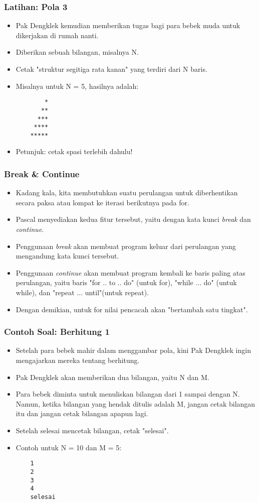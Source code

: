 \documentclass{beamer}
\begin{document}
\begin{frame}[fragile]
\frametitle{Latihan: Pola 3}
\begin{itemize}
	\item Pak Dengklek kemudian memberikan tugas bagi para bebek muda untuk dikerjakan di rumah nanti.
	\item Diberikan sebuah bilangan, misalnya N.
	\item Cetak "struktur segitiga rata kanan" yang terdiri dari N baris.
	\item Misalnya untuk N = 5, hasilnya adalah:
	\begin{lstlisting}
	    *
	   **
	  ***
	 ****
	*****
	\end{lstlisting} 
	\item Petunjuk: cetak spasi terlebih dahulu!
\end{itemize}
\end{frame}

\begin{frame}
\frametitle{Break \& Continue}
\begin{itemize}
	\item Kadang kala, kita membutuhkan suatu perulangan untuk diberhentikan secara paksa atau lompat ke iterasi berikutnya pada for.
	\item Pascal menyediakan kedua fitur tersebut, yaitu dengan kata kunci \alert{\textit{break}} dan \alert{\textit{continue}}.
	\item Penggunaan \textit{break} akan membuat program keluar dari perulangan yang mengandung kata kunci tersebut.
	\item Penggunaan \textit{continue} akan membuat program kembali ke baris paling atas perulangan, yaitu baris "for .. to .. do" (untuk for), "while ... do" (untuk while), dan "repeat ... until"(untuk repeat).
	\item Dengan demikian, untuk for nilai pencacah akan "bertambah satu tingkat".
\end{itemize}
\end{frame}

\begin{frame}[fragile]
\frametitle{Contoh Soal: Berhitung 1}
\begin{itemize}
	\item Setelah para bebek mahir dalam menggambar pola, kini Pak Dengklek ingin mengajarkan mereka tentang berhitung.
	\item Pak Dengklek akan memberikan dua bilangan, yaitu N dan M.
	\item Para bebek diminta untuk menuliskan bilangan dari 1 sampai dengan N. Namun, ketika bilangan yang hendak ditulis adalah M, jangan cetak bilangan itu dan jangan cetak bilangan apapun lagi.
	\item Setelah selesai mencetak bilangan, cetak "selesai".
	\item Contoh untuk N = 10 dan M = 5:
	\begin{lstlisting}
	1
	2
	3
	4
	selesai
	\end{lstlisting}
\end{itemize}
\end{frame}
\end{document}
